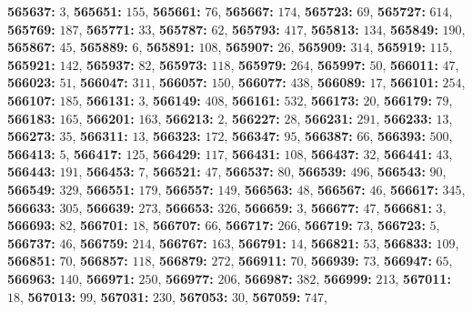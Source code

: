 \textsf{\bfseries 565637:} $3$, \textsf{\bfseries 565651:} $155$, \textsf{\bfseries 565661:} $76$, \textsf{\bfseries 565667:} $174$, \textsf{\bfseries 565723:} $69$, \textsf{\bfseries 565727:} $614$, \textsf{\bfseries 565769:} $187$, \textsf{\bfseries 565771:} $33$, \textsf{\bfseries 565787:} $62$, \textsf{\bfseries 565793:} $417$, \textsf{\bfseries 565813:} $134$, \textsf{\bfseries 565849:} $190$, \textsf{\bfseries 565867:} $45$, \textsf{\bfseries 565889:} $6$, \textsf{\bfseries 565891:} $108$, \textsf{\bfseries 565907:} $26$, \textsf{\bfseries 565909:} $314$, \textsf{\bfseries 565919:} $115$, \textsf{\bfseries 565921:} $142$, \textsf{\bfseries 565937:} $82$, \textsf{\bfseries 565973:} $118$, \textsf{\bfseries 565979:} $264$, \textsf{\bfseries 565997:} $50$, \textsf{\bfseries 566011:} $47$, \textsf{\bfseries 566023:} $51$, \textsf{\bfseries 566047:} $311$, \textsf{\bfseries 566057:} $150$, \textsf{\bfseries 566077:} $438$, \textsf{\bfseries 566089:} $17$, \textsf{\bfseries 566101:} $254$, \textsf{\bfseries 566107:} $185$, \textsf{\bfseries 566131:} $3$, \textsf{\bfseries 566149:} $408$, \textsf{\bfseries 566161:} $532$, \textsf{\bfseries 566173:} $20$, \textsf{\bfseries 566179:} $79$, \textsf{\bfseries 566183:} $165$, \textsf{\bfseries 566201:} $163$, \textsf{\bfseries 566213:} $2$, \textsf{\bfseries 566227:} $28$, \textsf{\bfseries 566231:} $291$, \textsf{\bfseries 566233:} $13$, \textsf{\bfseries 566273:} $35$, \textsf{\bfseries 566311:} $13$, \textsf{\bfseries 566323:} $172$, \textsf{\bfseries 566347:} $95$, \textsf{\bfseries 566387:} $66$, \textsf{\bfseries 566393:} $500$, \textsf{\bfseries 566413:} $5$, \textsf{\bfseries 566417:} $125$, \textsf{\bfseries 566429:} $117$, \textsf{\bfseries 566431:} $108$, \textsf{\bfseries 566437:} $32$, \textsf{\bfseries 566441:} $43$, \textsf{\bfseries 566443:} $191$, \textsf{\bfseries 566453:} $7$, \textsf{\bfseries 566521:} $47$, \textsf{\bfseries 566537:} $80$, \textsf{\bfseries 566539:} $496$, \textsf{\bfseries 566543:} $90$, \textsf{\bfseries 566549:} $329$, \textsf{\bfseries 566551:} $179$, \textsf{\bfseries 566557:} $149$, \textsf{\bfseries 566563:} $48$, \textsf{\bfseries 566567:} $46$, \textsf{\bfseries 566617:} $345$, \textsf{\bfseries 566633:} $305$, \textsf{\bfseries 566639:} $273$, \textsf{\bfseries 566653:} $326$, \textsf{\bfseries 566659:} $3$, \textsf{\bfseries 566677:} $47$, \textsf{\bfseries 566681:} $3$, \textsf{\bfseries 566693:} $82$, \textsf{\bfseries 566701:} $18$, \textsf{\bfseries 566707:} $66$, \textsf{\bfseries 566717:} $266$, \textsf{\bfseries 566719:} $73$, \textsf{\bfseries 566723:} $5$, \textsf{\bfseries 566737:} $46$, \textsf{\bfseries 566759:} $214$, \textsf{\bfseries 566767:} $163$, \textsf{\bfseries 566791:} $14$, \textsf{\bfseries 566821:} $53$, \textsf{\bfseries 566833:} $109$, \textsf{\bfseries 566851:} $70$, \textsf{\bfseries 566857:} $118$, \textsf{\bfseries 566879:} $272$, \textsf{\bfseries 566911:} $70$, \textsf{\bfseries 566939:} $73$, \textsf{\bfseries 566947:} $65$, \textsf{\bfseries 566963:} $140$, \textsf{\bfseries 566971:} $250$, \textsf{\bfseries 566977:} $206$, \textsf{\bfseries 566987:} $382$, \textsf{\bfseries 566999:} $213$, \textsf{\bfseries 567011:} $18$, \textsf{\bfseries 567013:} $99$, \textsf{\bfseries 567031:} $230$, \textsf{\bfseries 567053:} $30$, \textsf{\bfseries 567059:} $747$, 
